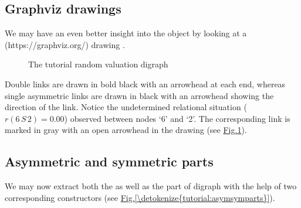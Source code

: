 \documentclass[a4paper,12pt,english]{sphinxhowto}
\let\sphinxpxdimen\pdfpxdimen\else\newdimen\sphinxpxdimen
\begin{document}
\subsection{Graphviz drawings}
\label{\detokenize{tutorial:graphviz-drawings}}
We may have an even better insight into the  object  by looking at a  (https://graphviz.org/)  drawing \sphinxfootnotemark[1] .

\begin{sphinxVerbatim}[commandchars=\\\{\},numbers=left,firstnumber=1,stepnumber=1]
\end{sphinxVerbatim}

\begin{figure}[H]
\centering
\capstart

\noindent\sphinxincludegraphics[width=300\sphinxpxdimen]{{tutRandValDigraph}.png}
\caption{The tutorial random valuation digraph}\label{\detokenize{tutorial:tutorialvaldigraph}}\end{figure}

Double links are drawn in bold black with an arrowhead at each end, whereas single asymmetric links are drawn in black with an arrowhead showing the direction of the link. Notice the undetermined relational situation (\(r(6\,S\,2) = 0.00\)) observed between nodes ‘6’ and ‘2’. The corresponding link is marked in gray with an open arrowhead in the drawing (see \hyperref[\detokenize{tutorial:tutorialvaldigraph}]{Fig.\@ \ref{\detokenize{tutorial:tutorialvaldigraph}}}).


\subsection{Asymmetric and symmetric parts}
\label{\detokenize{tutorial:asymmetric-and-symmetric-parts}}
We may now extract both the  as well as the  part of digraph  with the help of two corresponding constructors (see \hyperref[\detokenize{tutorial:asymsymparts}]{Fig.\@ \ref{\detokenize{tutorial:asymsymparts}}}).
\end{document}
